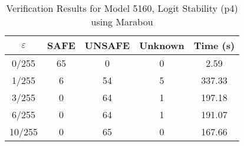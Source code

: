 \begin{table}[htbp]
\centering
\caption{Verification Results for Model 5160, Logit Stability (p4) using Marabou}
\label{tab:model5160_p4_marabou}
\begin{tabular}{|c|c|c|c|c|}
\hline
$\varepsilon$ & SAFE & UNSAFE & Unknown & Time (s) \\ \hline
0/255 & 65 & 0 & 0 & 2.59 \\ \hline
1/255 & 6 & 54 & 5 & 337.33 \\ \hline
3/255 & 0 & 64 & 1 & 197.18 \\ \hline
6/255 & 0 & 64 & 1 & 191.07 \\ \hline
10/255 & 0 & 65 & 0 & 167.66 \\ \hline
\end{tabular}
\end{table}
